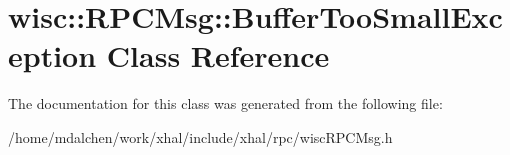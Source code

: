 \hypertarget{classwisc_1_1RPCMsg_1_1BufferTooSmallException}{
\section{wisc::RPCMsg::BufferTooSmallException Class Reference}
\label{classwisc_1_1RPCMsg_1_1BufferTooSmallException}
}


The documentation for this class was generated from the following file:\begin{DoxyCompactItemize}
\item 
/home/mdalchen/work/xhal/include/xhal/rpc/wiscRPCMsg.h\end{DoxyCompactItemize}
